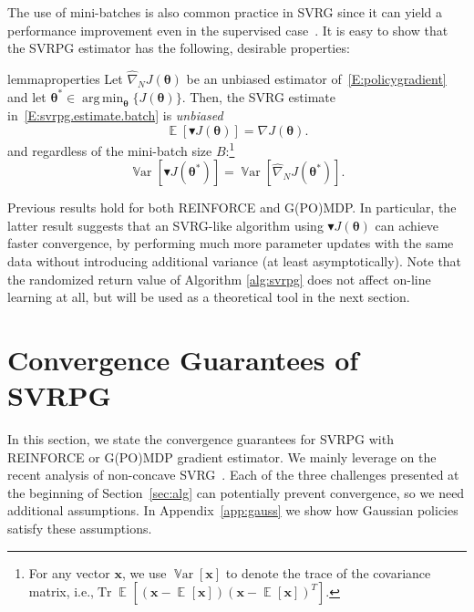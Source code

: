 \documentclass{article}
\makeatletter
\theoremstyle{remark}
\theoremstyle{definition}
\DeclareRobustCommand{\ie}{i.e.,\@\xspace}
\DeclareMathOperator*{\argmin}{arg\,min}
\DeclareMathOperator*{\EV}{\mathbb{E}}
\DeclareMathOperator{\Tr}{Tr}
\DeclareMathOperator*{\Var}{\mathbb{V}ar}
\newcommand{\EVV}[2][\ppvect \in \ppspace]{\EV_{#1}\left[{#2}\right]}
\newcommand{\vtheta}{\boldsymbol{\theta}}
\newcommand{\Reward}{\mathcal{R}}
\newcommand{\gradJ}[1]{\nabla J(#1)}
\newcommand{\gradBlack}[1]{\blacktriangledown J(#1)}
\newcommand{\wt}[1]{\widetilde{#1}}
\newcommand{\wh}[1]{\widehat{#1}}
\makeatother
\begin{document}
The use of mini-batches is also common practice in SVRG since it can yield a performance improvement even in the supervised case~\citep{harikandeh2015stopwasting,konevcny2016mini}. It is easy to show that the SVRPG estimator has the following, desirable properties:
\begin{restatable}[]{lemma}{properties}\label{L:svrpg.properties}
        Let $\wh{\nabla}_N J(\vtheta)$ be an unbiased estimator of~\eqref{E:policygradient}
and let $\vtheta^* \in \argmin_{\vtheta} \{J(\vtheta)\}$. Then, the SVRG estimate in~\eqref{E:svrpg.estimate.batch} is \emph{unbiased}
\begin{equation}\label{eq:unbiased}
\mathop{\mathbb{E}}
\left[\blacktriangledown J(\vtheta)\right] = \gradJ{\vtheta}.
\end{equation}
and regardless of the mini-batch size $B$:\footnote{
For any vector $\mathbf{x}$, we use $\Var[\mathbf{x}]$ to denote the trace of the covariance matrix, \ie $\Tr\EVV[]{(\mathbf{x}-\EVV[]{\mathbf{x}})(\mathbf{x}-\EVV[]{\mathbf{x}})^T}$.}
\begin{equation}\label{eq:zerovar}
	\Var\left[\gradBlack{\vtheta^*}\right] = 
    \Var\left[\wh{\nabla}_N J(\vtheta^*)\right].
\end{equation}
\end{restatable}

Previous results hold for both REINFORCE and G(PO)MDP.
In particular, the latter result suggests that an SVRG-like algorithm using $\gradBlack{\vtheta}$ can achieve faster convergence, by performing much more parameter updates with the same data without introducing additional variance (at least asymptotically).
{\color{blue}Note that the randomized return value of Algorithm \ref{alg:svrpg} does not affect on-line learning at all, but will be used as a theoretical tool in the next section.}

\section{Convergence Guarantees of SVRPG}\label{sec:conv}
In this section, we state the convergence guarantees for SVRPG with REINFORCE or G(PO)MDP gradient estimator.
We mainly leverage on the recent analysis of non-concave SVRG~\cite{reddi2016stochastic,allen2016variance}.
Each of the three challenges presented at the beginning of Section~\ref{sec:alg} can potentially prevent convergence, so we need additional assumptions.
In Appendix~\ref{app:gauss} we show how Gaussian policies satisfy these assumptions.
\end{document}
